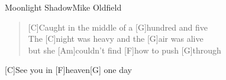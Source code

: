 \begin{song}{Moonlight Shadow}{Mike Oldfield}

    \begin{verse}  
        [C]Caught in the middle of a [G]hundred and five \\
        The [C]night was heavy and the [G]air was alive \\
        but she [Am]couldn't find [F]how to push [G]through
    \end{verse}  


    [C]See you in [F]heaven[G] one day\\

\end{song}
